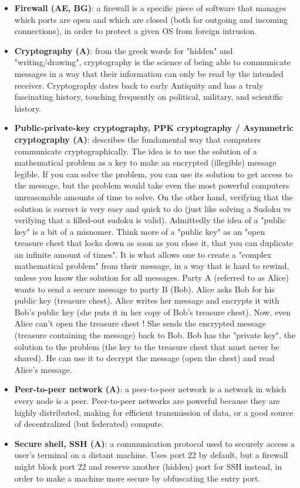 \documentclass{article}
\begin{document}
\begin{itemize}
	\item \textbf{Firewall (AE, BG)}: a firewall is a specific piece of software that manages which ports are open and which are closed (both for outgoing and incoming connections), in order to protect a given OS from foreign intrusion.

	\item \textbf{Cryptography (A)}: from the greek words for "hidden" and "writing/drawing", cryptography is the science of being able to communicate messages in a way that their information can only be read by the intended receiver. Cryptography dates back to early Antiquity and has a truly fascinating history, touching frequently on political, military, and scientific history. 

	\item \textbf{Public-private-key cryptography, PPK cryptography / Asymmetric cryptography (A)}: describes the fundamental way that computers communicate cryptographically. The idea is to use the solution of a mathematical problem as a key to make an encrypted (illegible) message legible. If you can solve the problem, you can use its solution to get access to the message, but the problem would take even the most powerful computers unreasonable amounts of time to solve. On the other hand, verifying that the solution is correct is very easy and quick to do (just like solving a Sudoku vs verifying that a filled-out sudoku is valid). Admittedly the idea of a "public key" is a bit of a misnomer. Think more of a "public key" as an "open treasure chest that locks down as soon as you close it, that you can duplicate an infinite amount of times". It is what allows one to create a "complex mathematical problem" from their message, in a way that is hard to rewind, unless you know the solution for all messages. Party A (referred to as Alice) wants to send a secure message to party B (Bob). Alice asks Bob for his public key (treasure chest). Alice writes her message and encrypts it with Bob's public key (she puts it in her copy of Bob's treasure chest). Now, even Alice can't open the treasure chest ! She sends the encrypted message (treasure containing the message) back to Bob. Bob has the "private key", the solution to the problem (the key to the treasure chest that must never be shared). He can use it to decrypt the message (open the chest) and read Alice's message.

	\item \textbf{Peer-to-peer network (A)}: a peer-to-peer network is a network in which every node is a peer. Peer-to-peer networks are powerful because they are highly distributed, making for efficient transmission of data, or a good source of decentralized (but federated) compute.

	\item \textbf{Secure shell, SSH (A)}: a communication protocol used to securely access a user's terminal on a distant machine. Uses port 22 by default, but a firewall might block port 22 and reserve another (hidden) port for SSH instead, in order to make a machine more secure by obfuscating the entry port.

\end{itemize}
\end{document}
